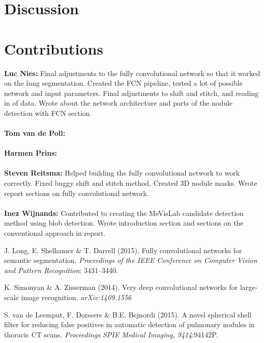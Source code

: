 \documentclass{article}
\begin{document}
\section{Discussion}\label{sec:discussion}


\appendix
\section{Contributions}
\textbf{Luc Nies:} Final adjustments to the fully convolutional network so that it worked on the lung segmentation. Created the FCN pipeline, tested a lot of possible network and input parameters. Final adjustments to shift and stitch, and reading in of data. Wrote about the network architecture and parts of the nodule detection with FCN section.\\
\\
\textbf{Tom van de Poll:} \\
\\
\textbf{Harmen Prins:} \\
\\
\textbf{Steven Reitsma:} Helped building the fully convolutional network to work correctly. Fixed buggy shift and stitch method. Created 3D nodule masks. Wrote report sections on fully convolutional network. \\
\\
\textbf{Inez Wijnands:} Contributed to creating the MeVisLab candidate detection method using blob detection. Wrote introduction section and sections on the conventional approach in report.



\begin{thebibliography}{}
J. Long, E. Shelhamer \& T. Darrell (2015). Fully convolutional networks for semantic segmentation. \emph{Proceedings of the IEEE Conference on Computer Vision and Pattern Recognition}: 3431--3440.

K. Simonyan \& A. Zisserman (2014). Very deep convolutional networks for large-scale image recognition. \emph{arXiv:1409.1556}

S. van de Leemput, F. Dorssers \& B.E. Bejnordi (2015). A novel spherical shell filter for reducing false positives in automatic detection of pulmonary nodules in thoracic CT scans. \emph{Proceedings SPIE Medical Imaging, 9414}:94142P.

\end{thebibliography}
\end{document}

